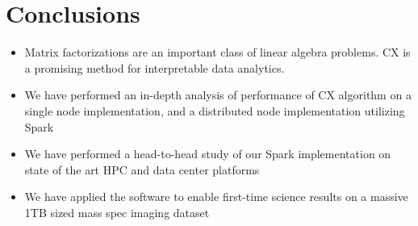 \section{Conclusions}
\label{sec:conclusion}

\begin{itemize}
\item Matrix factorizations are an important class of linear algebra problems. CX is a promising method for interpretable data analytics.
\item We have performed an in-depth analysis of performance of CX algorithm on a single node implementation, and a distributed node implementation utilizing Spark
\item We have performed a head-to-head study of our Spark implementation on state of the art HPC and data center platforms
\item We have applied the software to enable first-time science results on a massive 1TB sized mass spec imaging dataset
\end{itemize}
